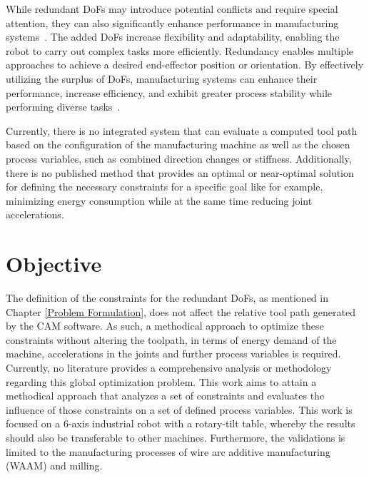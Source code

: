 
While redundant \acrshort{DoF}s may introduce potential conflicts and require special attention, they can also significantly enhance performance in manufacturing systems~\cite{Ayten.2016}. The added \acrshort{DoF}s increase flexibility and adaptability, enabling the robot to carry out complex tasks more efficiently. Redundancy enables multiple approaches to achieve a desired end-effector position or orientation. By effectively utilizing the surplus of \acrshort{DoF}s, manufacturing systems can enhance their performance, increase efficiency, and exhibit greater process stability while performing diverse tasks~\cite{Boscariol.2020}. 

Currently, there is no integrated system that can evaluate a computed tool path based on the configuration of the manufacturing machine as well as the chosen process variables, such as combined direction changes or stiffness. %
Additionally, there is no published method that provides an optimal or near-optimal solution for defining the necessary constraints for a specific goal like for example, minimizing energy consumption while at the same time reducing joint accelerations.


\section{Objective}\label{OBJECTIVE}
The definition of the constraints for the redundant \acrshort{DoF}s, as mentioned in Chapter \ref{Problem Formulation}, does not affect the relative tool path generated by the \acrshort{CAM} software. As such, a methodical approach to optimize these constraints without altering the toolpath, in terms of energy demand of the machine, accelerations in the joints and further process variables is required. Currently, no literature provides a comprehensive analysis or methodology regarding this global optimization problem.
This work aims to attain a methodical approach that analyzes a set of constraints and evaluates the influence of those constraints on a set of defined process variables. This work is focused on a 6-axis industrial robot with a rotary-tilt table, whereby the results should also be transferable to other machines. Furthermore, the validations is limited to the manufacturing processes of wire arc additive manufacturing (\acrshort{WAAM}) and milling. 



